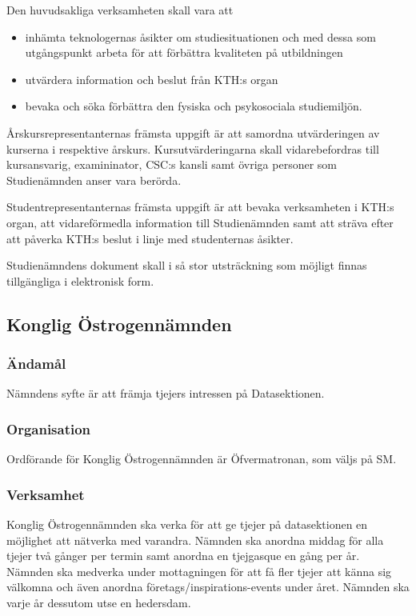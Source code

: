 \documentclass{dgovdoc}
\begin{document}
Den huvudsakliga verksamheten skall vara att

\begin{itemize}
  \item inhämta teknologernas åsikter om studiesituationen och med dessa som
    utgångspunkt arbeta för att förbättra kvaliteten på utbildningen
  \item utvärdera information och beslut från KTH:s organ
  \item bevaka och söka förbättra den fysiska och psykosociala studiemiljön.
\end{itemize}

Årskursrepresentanternas främsta uppgift är att samordna utvärderingen av
kurserna i respektive årskurs. Kursutvärderingarna skall vidarebefordras till
kursansvarig, examininator, CSC:s kansli samt övriga personer som Studienämnden
anser vara berörda.

Studentrepresentanternas främsta uppgift är att bevaka verksamheten i KTH:s
organ, att vidareförmedla information till Studienämnden samt att sträva efter
att påverka KTH:s beslut i linje med studenternas åsikter.

Studienämndens dokument skall i så stor utsträckning som möjligt finnas
tillgängliga i elektronisk form.

\subsection{Konglig Östrogennämnden}

\subsubsection{Ändamål}

Nämndens syfte är att främja tjejers intressen på Datasektionen.

\subsubsection{Organisation}

Ordförande för Konglig Östrogennämnden är Öfvermatronan, som väljs på SM.

\subsubsection{Verksamhet}

Konglig Östrogennämnden ska verka för att ge tjejer på datasektionen en
möjlighet att nätverka med varandra. Nämnden ska anordna middag för alla tjejer
två gånger per termin samt anordna en tjejgasque en gång per år. Nämnden ska
medverka under mottagningen för att få fler tjejer att känna sig välkomna och
även anordna företags/inspirations-events under året. Nämnden ska varje år
dessutom utse en hedersdam.
\end{document}
